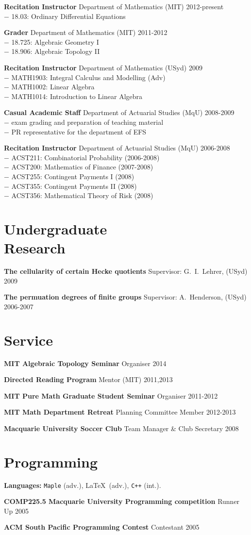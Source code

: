 \documentclass[margin,line]{resume}
\newcommand{\CVsection}[1]{\section{\mysidestyle #1}}
\newcommand{\entry}[3]{\textbf{#1} #2 \hfill {#3}
           
\vspace{-2.7mm}}
\newcommand{\twolineentry}[4]{\textbf{#1} #2 \hfill {#4}\\%
#3
           
\vspace{-2.7mm}}
\newcommand{\FINALentry}[3]{\textbf{#1} #2 \hfill {#3}}
\newcommand{\FINALtwolineentry}[4]{\textbf{#1} #2 \hfill {#4}\\%
#3}
\begin{document}
\begin{resume}
\twolineentry{Recitation Instructor}{Department of Mathematics (MIT)}{\phantom{space}$-$ 18.03: Ordinary Differential Equations}{2012-present}
\twolineentry{Grader}{Department of Mathematics (MIT)}{%
\phantom{space}$-$ 18.725: Algebraic Geometry I\\
\phantom{space}$-$ 18.906: Algebraic Topology II%
}{2011-2012}
\twolineentry{Recitation Instructor}{Department of Mathematics (USyd)}{%
\phantom{space}$-$ MATH1903: Integral Calculus and Modelling (Adv)\\
\phantom{space}$-$ MATH1002: Linear Algebra\\
\phantom{space}$-$ MATH1014: Introduction to Linear Algebra%
}{2009}
\twolineentry{Casual Academic Staff}{Department of Actuarial Studies (MqU)}{%
\phantom{space}$-$ exam grading and preparation of teaching material\\
\phantom{space}$-$ PR representative for the department of EFS%
}{2008-2009}
\FINALtwolineentry{Recitation Instructor}{Department of Actuarial Studies (MqU)}{%
\phantom{space}$-$ ACST211: Combinatorial Probability (2006-2008)\\
\phantom{space}$-$ ACST200: Mathematics of Finance (2007-2008)\\
\phantom{space}$-$ ACST255: Contingent Payments I (2008)\\
\phantom{space}$-$ ACST355: Contingent Payments II (2008)\\
\phantom{space}$-$ ACST356: Mathematical Theory of Risk (2008)%
}{2006-2008}


\CVsection{Undergraduate \\ Research}

\entry{The cellularity of certain Hecke quotients}{Supervisor: G.\ I.\ Lehrer, (USyd)}{2009}
\FINALentry{The permuation degrees of finite groups}{Supervisor: A.\ Henderson, (USyd)}{2006-2007}


\CVsection{Service}

\entry{MIT Algebraic Topology Seminar}{Organiser}{2014}
\entry{Directed Reading Program}{Mentor (MIT)}{2011,2013}
\entry{MIT Pure Math Graduate Student Seminar}{Organiser}{2011-2012}
\entry{MIT Math Department Retreat}{Planning Committee Member}{2012-2013}
\FINALentry{Macquarie University Soccer Club}{Team Manager \& Club Secretary}{2008}


\CVsection{Programming}

\entry{Languages:}{\texttt{Maple} (adv.), \LaTeX\ (adv.), \texttt{C++} (int.).}{}
\entry{COMP225.5 Macquarie University Programming competition}{Runner Up}{2005}
\FINALentry{ACM South Pacific Programming Contest}{Contestant}{2005}



\end{resume}
\end{document}
